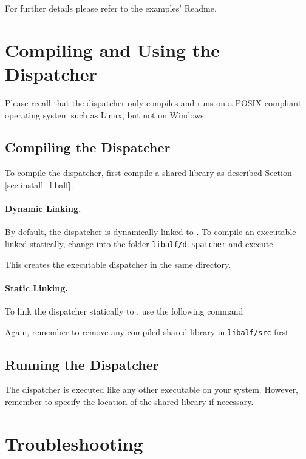
For further details please refer to the examples' Readme.

\section{Compiling and Using the Dispatcher}\label{sec:install_dispatcher}
Please recall that the dispatcher only compiles and runs on a POSIX-compliant operating system such as Linux, but not on Windows.

\subsection{Compiling the Dispatcher}
To compile the dispatcher, first compile a shared \libalf library as described Section \ref{sec:install_libalf}.

\paragraph{Dynamic Linking.}
By default, the dispatcher is dynamically linked to \libalf. To compile an executable linked statically, change into the folder \texttt{libalf/dispatcher} and execute


This creates the executable dispatcher in the same directory. 

\paragraph{Static Linking.}
To link the dispatcher statically to \libalf, use the following command


Again, remember to remove any compiled shared library in \texttt{libalf/src} first.

\subsection{Running the Dispatcher}
The dispatcher is executed like any other executable on your system. However, remember to specify the location of the \libalf shared library if necessary.


\section{Troubleshooting}


